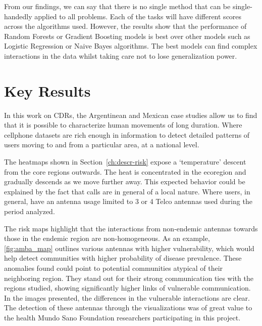 From our findings, we can say that there is no single method that can be single-handedly applied to all problems.
Each of the tasks will have different scores across the algorithms used.
However, the results show that the performance of Random Forests or Gradient Boosting models is best over other models such as Logistic Regression or Naive Bayes algorithms.
The best models can find complex interactions in the data whilst taking care not to lose generalization power.


\section{Key Results}



In this work on CDRs, the Argentinean and Mexican case studies allow us to find that it is possible to characterize human movements of long duration.
Where cellphone datasets are rich enough in information to detect detailed patterns of users moving to and from a particular area, at a national level.




The heatmaps shown in Section~\cref{ch:descr-risk} expose a `temperature' descent from the core regions outwards.
The heat is concentrated in the ecoregion and gradually descends as we move further away.
This expected behavior could be explained by the fact that calls are in general of a local nature.
Where users, in general, have an antenna usage limited to 3 or 4 Telco antennas used during the period analyzed.

The risk maps highlight that the interactions from non-endemic antennas towards those in the endemic region are non-homogeneous.
As an example, \cref{fig:amba_map} outlines various antennas with higher vulnerability, which would help detect communities with higher probability of disease prevalence.
These anomalies found could point to potential communities atypical of their neighboring region.
They stand out for their strong communication ties with the regions studied, showing significantly higher links of vulnerable communication.
In the images presented, the differences in the vulnerable interactions are clear.
The detection of these antennas through the visualizations was of great value to the health Mundo Sano Foundation researchers participating in this project.






